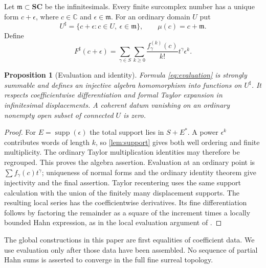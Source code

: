 \documentclass[11pt,letterpaper]{article}
\newtheorem{proposition}[theorem]{Proposition}
\theoremstyle{definition}
\theoremstyle{remark}
\newcommand{\C}{\mathbb C}
\newcommand{\SC}{\mathbf{SC}}
\newcommand{\mm}{\mathfrak m}
\newcommand{\sh}{^{\sharp}}
\newcommand{\supp}{\operatorname{supp}}
\numberwithin{equation}{section}
\begin{document}
Let $\mm\subset\SC$ be the infinitesimals. Every finite surcomplex number has a unique form $c+\epsilon$, where $c\in\C$ and $\epsilon\in\mm$. For an ordinary domain $U$ put
\[
 U\sh=\{c+\epsilon:c\in U,\ \epsilon\in\mm\},
 \qquad \mu(c)=c+\mm.
\]
Define
\begin{equation}\label{eq:evaluation}
 F\sh(c+\epsilon)=
 \sum_{\gamma\in S}\sum_{k\ge0}
 \frac{f_\gamma^{(k)}(c)}{k!}t^\gamma\epsilon^k.
\end{equation}
\begin{proposition}[Evaluation and identity]\label{prop:evaluation}
Formula \eqref{eq:evaluation} is strongly summable and defines an injective algebra homomorphism into functions on $U\sh$. It respects coefficientwise differentiation and formal Taylor expansion in infinitesimal displacements. A coherent datum vanishing on an ordinary nonempty open subset of connected $U$ is zero.
\end{proposition}
\begin{proof}
For $E=\supp(\epsilon)$ the total support lies in $S+E^*$. A power $\epsilon^k$ contributes words of length $k$, so \cref{lem:support} gives both well ordering and finite multiplicity. The ordinary Taylor multiplication identities may therefore be regrouped. This proves the algebra assertion. Evaluation at an ordinary point is $\sum f_\gamma(c)t^\gamma$; uniqueness of normal forms and the ordinary identity theorem give injectivity and the final assertion. Taylor recentering uses the same support calculation with the union of the finitely many displacement supports. The resulting local series has the coefficientwise derivatives. Its fine differentiation follows by factoring the remainder as a square of the increment times a locally bounded Hahn expression, as in the local evaluation argument of \cite{Supplied}.
\end{proof}
The global constructions in this paper are first equalities of coefficient data. We use evaluation only after those data have been assembled. No sequence of partial Hahn sums is asserted to converge in the full fine surreal topology.
\end{document}
